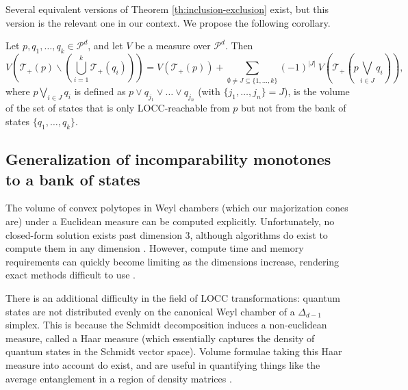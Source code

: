 Several equivalent versions of Theorem \ref{th:inclusion-exclusion} exist, but this version is the relevant one in our context. We propose the following corollary.

\begin{corollary} \label{corr:LOCC_inclusion-exclusion}
    Let $p, q_1, \dots, q_k \in \mathcal{P}^d$, and let $V$ be a measure over $\mathcal{P}^d$. Then
    \begin{equation} \label{eq:LOCC_inclusion-exclusion}
        V\left(\mathcal{T}_+(p) \backslash \left(\bigcup\limits_{i = 1}^k \mathcal{T}_+(q_i)\right)\right) = V\left(\mathcal{T}_+(p)\right) + \sum_{\emptyset \neq J \subseteq \{1, \dots, k\}} (-1)^{|J|} \: V\left(\mathcal{T}_+\left(p \bigvee\limits_{i \in J} q_i\right)\right),
    \end{equation}
    where $p \bigvee\limits_{i \in J} q_i$ is defined as $p \vee q_{j_1} \vee \dots \vee q_{j_n}$ (with $\{j_1, \dots, j_n\} = J$), is the volume of the set of states that is only LOCC-reachable from $p$ but not from the bank of states $\{q_1, \dots, q_k\}$.
\end{corollary}



\subsection{Generalization of incomparability monotones to a bank of states}

The volume of convex polytopes in Weyl chambers (which our majorization cones are) under a Euclidean measure can be computed explicitly. Unfortunately, no closed-form solution exists past dimension 3, although algorithms do exist to compute them in any dimension \cite{junior_geometric_2022}. However, compute time and memory requirements can quickly become limiting as the dimensions increase, rendering exact methods difficult to use \cite{bueler_exact_2000}.

There is an additional difficulty in the field of LOCC transformations: quantum states are not distributed evenly on the canonical Weyl chamber of a $\Delta_{d-1}$ simplex. This is because the Schmidt decomposition induces a non-euclidean measure, called a Haar measure (which essentially captures the density of quantum states in the Schmidt vector space). Volume formulae taking this Haar measure into account do exist, and are useful in quantifying things like the average entanglement in a region of density matrices \cite{zyczkowski_induced_2001}.

